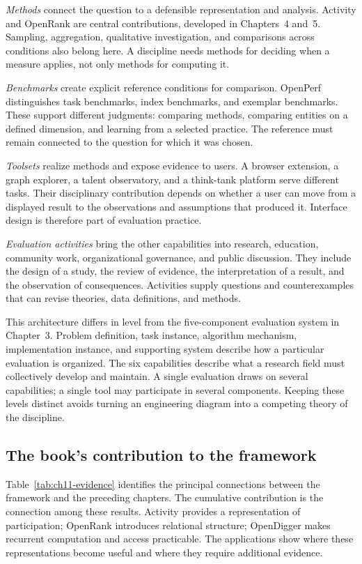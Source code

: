 \emph{Methods} connect the question to a defensible representation and analysis. Activity and OpenRank are central contributions, developed in Chapters~4 and~5. Sampling, aggregation, qualitative investigation, and comparisons across conditions also belong here. A discipline needs methods for deciding when a measure applies, not only methods for computing it.

\emph{Benchmarks} create explicit reference conditions for comparison. OpenPerf distinguishes task benchmarks, index benchmarks, and exemplar benchmarks. These support different judgments: comparing methods, comparing entities on a defined dimension, and learning from a selected practice. The reference must remain connected to the question for which it was chosen.

\emph{Toolsets} realize methods and expose evidence to users. A browser extension, a graph explorer, a talent observatory, and a think-tank platform serve different tasks. Their disciplinary contribution depends on whether a user can move from a displayed result to the observations and assumptions that produced it. Interface design is therefore part of evaluation practice.

\emph{Evaluation activities} bring the other capabilities into research, education, community work, organizational governance, and public discussion. They include the design of a study, the review of evidence, the interpretation of a result, and the observation of consequences. Activities supply questions and counterexamples that can revise theories, data definitions, and methods.

This architecture differs in level from the five-component evaluation system in Chapter~3. Problem definition, task instance, algorithm mechanism, implementation instance, and supporting system describe how a particular evaluation is organized. The six capabilities describe what a research field must collectively develop and maintain. A single evaluation draws on several capabilities; a single tool may participate in several components. Keeping these levels distinct avoids turning an engineering diagram into a competing theory of the discipline.

\subsection{The book's contribution to the framework}
Table~\ref{tab:ch11-evidence} identifies the principal connections between the framework and the preceding chapters. The cumulative contribution is the connection among these results. Activity provides a representation of participation; OpenRank introduces relational structure; OpenDigger makes recurrent computation and access practicable. The applications show where these representations become useful and where they require additional evidence.


